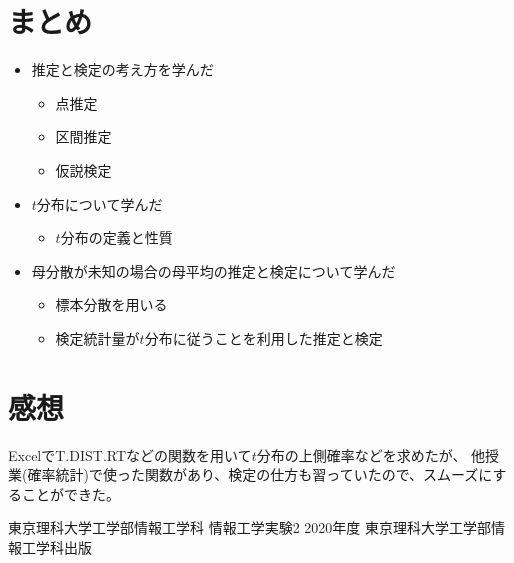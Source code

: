 \documentclass[12pt]{jarticle}
\begin{document}
\section{まとめ}
\begin{itemize}
      \item 推定と検定の考え方を学んだ
            \begin{itemize}
                  \item 点推定
                  \item 区間推定
                  \item 仮説検定
            \end{itemize}
      \item $t$分布について学んだ
            \begin{itemize}
                  \item $t$分布の定義と性質
            \end{itemize}
      \item 母分散が未知の場合の母平均の推定と検定について学んだ
            \begin{itemize}
                  \item 標本分散を用いる
                  \item 検定統計量が$t$分布に従うことを利用した推定と検定
            \end{itemize}
\end{itemize}

\section{感想}
ExcelでT.DIST.RTなどの関数を用いて$t$分布の上側確率などを求めたが、
他授業(確率統計)で使った関数があり、検定の仕方も習っていたので、スムーズにすることができた。


\clearpage
\begin{thebibliography}{99}
      \label{sannkoubunnkenn_chapter}
      東京理科大学工学部情報工学科 情報工学実験2 2020年度
      東京理科大学工学部情報工学科出版
\end{thebibliography}

\clearpage

\appendix
\end{document}
